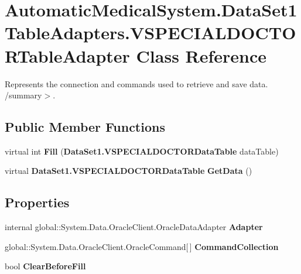 \section{AutomaticMedicalSystem.DataSet1TableAdapters.VSPECIALDOCTORTableAdapter Class Reference}
\label{class_automatic_medical_system_1_1_data_set1_table_adapters_1_1_v_s_p_e_c_i_a_l_d_o_c_t_o_r_table_adapter}
Represents the connection and commands used to retrieve and save data. /summary$>$.  


\subsection*{Public Member Functions}
\begin{CompactItemize}
\item 
virtual int \textbf{Fill} ({\bf DataSet1.VSPECIALDOCTORDataTable} dataTable)\label{class_automatic_medical_system_1_1_data_set1_table_adapters_1_1_v_s_p_e_c_i_a_l_d_o_c_t_o_r_table_adapter_6195e1070fba448075ec6c38810580f1}

\item 
virtual {\bf DataSet1.VSPECIALDOCTORDataTable} \textbf{GetData} ()\label{class_automatic_medical_system_1_1_data_set1_table_adapters_1_1_v_s_p_e_c_i_a_l_d_o_c_t_o_r_table_adapter_02039be80c8c84afa4c987af9d1c4892}

\end{CompactItemize}
\subsection*{Properties}
\begin{CompactItemize}
\item 
internal global::System.Data.OracleClient.OracleDataAdapter \textbf{Adapter}\hspace{0.3cm}{\tt  [get]}\label{class_automatic_medical_system_1_1_data_set1_table_adapters_1_1_v_s_p_e_c_i_a_l_d_o_c_t_o_r_table_adapter_c63ccb3ef559b8642a43579dd741b585}

\item 
global::System.Data.OracleClient.OracleCommand[$\,$] \textbf{CommandCollection}\hspace{0.3cm}{\tt  [get]}\label{class_automatic_medical_system_1_1_data_set1_table_adapters_1_1_v_s_p_e_c_i_a_l_d_o_c_t_o_r_table_adapter_23caa183d9a404c62661dd5f8997e3a4}

\item 
bool \textbf{ClearBeforeFill}\hspace{0.3cm}{\tt  [get, set]}\label{class_automatic_medical_system_1_1_data_set1_table_adapters_1_1_v_s_p_e_c_i_a_l_d_o_c_t_o_r_table_adapter_3382733dc238a2e1a37ccbfe7bce3fdd}

\end{CompactItemize}


